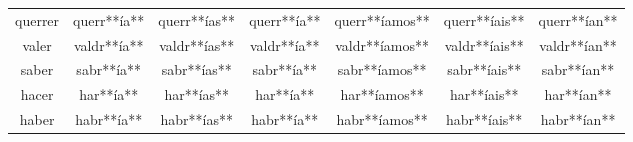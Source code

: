 \begin{tabular}{ccccccc}
querrer         & querr**ía**    & querr**ías**    & querr**ía**         & querr**íamos**     & querr**íais**      & querr**ían**              \\
valer           & valdr**ía**    & valdr**ías**    & valdr**ía**         & valdr**íamos**     & valdr**íais**      & valdr**ían**              \\
saber           & sabr**ía**     & sabr**ías**     & sabr**ía**          & sabr**íamos**      & sabr**íais**       & sabr**ían**               \\
hacer           & har**ía**      & har**ías**      & har**ía**           & har**íamos**       & har**íais**        & har**ían**                \\
haber           & habr**ía**     & habr**ías**     & habr**ía**          & habr**íamos**      & habr**íais**       & habr**ían**               \\
\hline
\end{tabular}